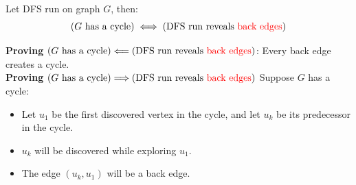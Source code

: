   \newpage
  \begin{theo}

    Let DFS run on graph $G$, then:
    \[
\left( G \text{ has a cycle} \right) \iff \left( \text{DFS run reveals \textcolor{red}{back edges}} \right)
\]

  \end{theo}
  \begin{Proof}
    \textbf{Proving} $\left( G \text{ has a cycle} \right) \Longleftarrow \left( \text{DFS run reveals \textcolor{red}{back edges}} \right)$: Every back edge creates a cycle.\\
    \textbf{Proving} $\left( G \text{ has a cycle} \right) \Longrightarrow \left( \text{DFS run reveals \textcolor{red}{back edges}} \right)$ Suppose $G$ has a cycle:
    \begin{itemize}
        \item Let $u_1$ be the first discovered vertex in the cycle, and let $u_k$ be its predecessor in the cycle.
        \item $u_k$ will be discovered while exploring $u_1$.
        \item The edge $(u_k, u_1)$ will be a back edge.
    \end{itemize}
    \end{Proof}
    
   
    